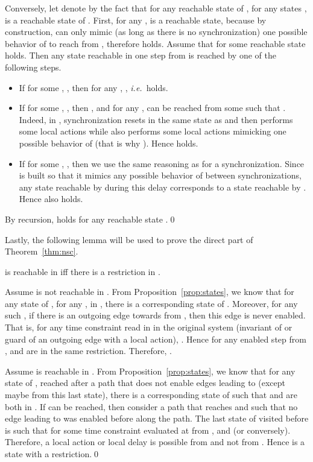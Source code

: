 \documentclass{LMCS}
\theoremstyle{plain}\newtheorem*{prop11}{Proposition~\ref{prop:states} bis}
\def\ie{{\em i.e.\ }}
\begin{document}
  Conversely, let denote by  the fact that for any reachable
  state  of , for any states
  ,  is a reachable state of
  .
  First, for any , 
  is a reachable state, because by construction,  can only mimic
  (as long as there is no synchronization) one possible behavior of 
  to reach  from , therefore 
  holds.
  Assume that for some reachable state   holds.
  Then any state reachable in one step from  is reached by one of
  the following steps.
  \begin{itemize}
  \item If for some ,
    , then for any
    \mbox{},
    ,
    \ie  holds.
  \item If for some ,
    , then , and
    for any \mbox{},  can be
    reached from some  such that \mbox{}.
    Indeed, in , synchronization  resets
     in the same state as  and then
     performs some local actions while  also performs some
    local actions mimicking one possible behavior of  (that is why
    ).
    Hence  holds.
  \item If for some ,
    , then we use the same reasoning as
    for a synchronization. Since  is built
    so that it mimics any possible behavior of  between synchronizations,
    any state  reachable by  during this delay
    corresponds to a state  reachable by .
    Hence  also holds.
  \end{itemize}
  By recursion,  holds for any reachable state .\qed


Lastly, the following lemma will be used to prove the direct part of
Theorem~\ref{thm:nsc}.

\begin{lem}\label{lem:sad_equiv_read}
   is reachable in  iff there is a restriction
  in .
\end{lem}
\proof
  Assume  is not reachable in . From
  Proposition~\ref{prop:states}, we know that for any state  of
  , for any ,  in , there is a
  corresponding state  of . Moreover, for
  any such , if there is an outgoing edge towards  from ,
  then this edge is never enabled. That is, for any time constraint 
  read in  in the original system  (invariant of  or
  guard of an outgoing edge with a local action),
  .
  Hence for any enabled step from ,  and  are in the
  same restriction. Therefore, .

  Assume  is reachable in . From
  Proposition~\ref{prop:states}, we know that for any state
   of , reached after a path that does not
  enable edges leading to  (except maybe from this last state), there
  is a corresponding state  of  such that
   and  are both in .
If  can be reached, then consider a path that reaches 
  and such that no edge leading to  was enabled before along the path.
  The last state  of  visited before  is such that
  for some time constraint  evaluated at  from ,
   and
   (or conversely).
  Therefore, a local action or local delay is possible from  and
  not from .
  Hence  is a state with a restriction.\qed
\end{document}
